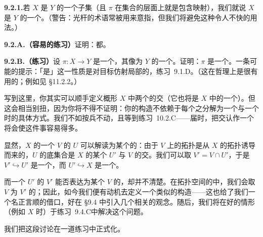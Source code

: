 \textbf{9.2.1.}\quad 若 $X$ 是 $Y$ 的一个子集（且 $\pi$ 在集合的层面上就是包含映射），我们就说 $X$ 是 $Y$ 的一个\textbf{\trLocally\trClosedSubscheme}。（警告：光杆的术语\textbf{\trSubscheme}常被用来意指\emph{\trLocally\trClosedSubscheme}，但我们将避免这种令人不快的用法。）

\textbf{9.2.A.（容易的练习）}\quad 证明：\trLocally\trClosedEmbedding{}都\trLocally\trFiniteType。

\textbf{9.2.B.（练习）}\quad 设 $\pi\colon X\to Y$ 是一个\trLocally\trClosedEmbedding，其像为 $Y$ 的一个\trClosedSubset。证明：$\pi$ 是一个\trClosedEmbedding。一条可能的提示：「是\trClosedEmbedding」这一性质是对目标仿射局部的，练习~9.1.D。（这在哲理上是很有用的；例如见 \S11.2.2。）

写到这里，你其实可以顺手定义概形 $X$ 中两个\trLocally\trClosedEmbedding{}的交（它也将是 $X$ 中的一个\trLocally\trClosedEmbedding）。但这会相当别扭，因为你将不得不证明：你的构造不依赖于每个\trLocally\trClosedEmbedding{}之分解为一个\trClosedEmbedding{}与一个\trOpenEmbedding{}时的具体方式。我们不如按兵不动，且等到\mbox{练习~10.2.C}——届时，把交认作一个\trFiberProduct{}将会使这件事容易得多。

显然，$X$ 的一个\trClosedSubscheme{} $V$ 的\trOpenSubscheme{} $U$ 可以解读为某个\trOpenSubscheme{}的\trClosedSubscheme：由于 $V$ 上的拓扑是从 $X$ 的拓扑诱导而来的，$U$ 的底集合是 $X$ 的某个\trOpenSubset{} $U'$ 与 $V$ 的交。我们可以取 $V'=V\cap U'$，于是 $V'\hookrightarrow U'$ 是一个\trClosedEmbedding，而 $U'\hookrightarrow X$ 是一个\trOpenEmbedding。

而一个\trOpenSubscheme{} $U'$ 的\trClosedSubscheme{} $V'$ 能否表达为某个\trClosedSubscheme{} $V$ 的\trOpenSubscheme，却并不清楚。在拓扑空间的\trCategory{}中，我们会取 $V$ 为 $V'$ 的\trClosure；因此，如今我们便有动机去定义一个类似的构造——这也给了我们一个名正言顺的借口，好在 \S9.4 中引入几个相关的观念。随后，我们将在好的情形（例如 $X$ \trNoetherian{}时）于\mbox{练习~9.4.C}中解决这个问题。

我们把这段讨论在一道练习中正式化。

